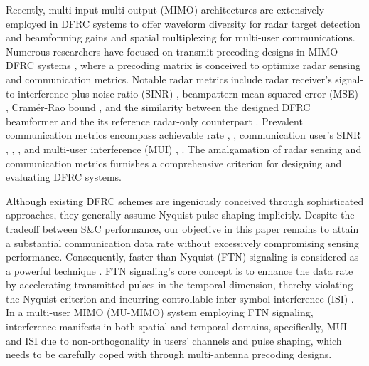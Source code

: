 \documentclass[lettersize,journal]{IEEEtran}
\newcommand{\nocolor}[1]{{\color{black}#1}}
\begin{document}
\nocolor{Recently,} multi-input multi-output (MIMO) architectures are extensively employed in DFRC systems to offer waveform diversity for radar target detection \cite{li2007mimo} and beamforming gains and spatial multiplexing for multi-user communications. Numerous researchers have focused on transmit precoding designs in MIMO DFRC systems \cite{mccormick2017simultaneous,qian2018joint,tang2020waveform,kumari2019adaptive,liu2020range,liu2018toward,liu2018mu,cheng2020hybrid,yuan2020bayesian,xu2020multi,su2020secure,bazzi2023outage}, \nocolor{where a precoding matrix is conceived to optimize radar sensing and communication metrics.} Notable radar metrics include radar receiver's signal-to-interference-plus-noise ratio (SINR) \cite{qian2018joint}, beampattern mean squared error (MSE) \cite{tang2020waveform}, Cram\'er-Rao bound \cite{kumari2019adaptive}, and the similarity between the designed DFRC beamformer and the its reference radar-only counterpart \cite{liu2020range,liu2018toward,liu2018mu,cheng2020hybrid}. Prevalent communication metrics encompass achievable rate \cite{yuan2020bayesian}, \cite{xu2020multi}, communication user's SINR \cite{liu2020range}, \cite{liu2018mu}, \cite{su2020secure}, and multi-user interference (MUI) \cite{tang2020waveform}, \cite{liu2018toward}. The amalgamation of radar sensing and communication metrics furnishes a comprehensive criterion for \nocolor{designing and evaluating} DFRC systems.

Although existing DFRC schemes are ingeniously conceived through sophisticated approaches, they generally assume Nyquist pulse shaping implicitly. Despite the tradeoff between S\&C performance, our objective in this paper remains to attain a substantial communication data rate without excessively compromising sensing performance. Consequently, faster-than-Nyquist (FTN) signaling is \nocolor{considered as a powerful technique} \cite{anderson2013faster}. FTN signaling's core concept is to enhance the data rate by accelerating transmitted pulses in the temporal dimension, thereby violating the Nyquist criterion and incurring controllable inter-symbol interference (ISI) \cite{anderson2013faster}. In a multi-user MIMO (MU-MIMO) system employing FTN signaling, interference manifests in both spatial and temporal domains, specifically, MUI and ISI due to non-orthogonality in users' channels and pulse shaping, \nocolor{which needs to be carefully coped with through multi-antenna precoding designs.}

\end{document}
